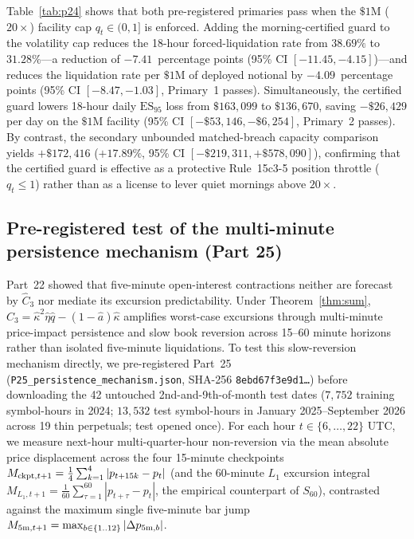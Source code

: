 Table~\ref{tab:p24} shows that both pre-registered primaries pass when the $\$1\text{M}$ ($20\times$) facility cap $q_t\in(0,1]$ is enforced. Adding the morning-certified guard to the volatility cap reduces the 18-hour forced-liquidation rate from $38.69\%$ to $31.28\%$---a reduction of $-7.41$~percentage points (95\% CI $[-11.45,-4.15]$)---and reduces the liquidation rate per $\$1\text{M}$ of deployed notional by $-4.09$~percentage points (95\% CI $[-8.47,-1.03]$, Primary~1 passes). Simultaneously, the certified guard lowers 18-hour daily $\mathrm{ES}_{95}$ loss from $\$163{,}099$ to $\$136{,}670$, saving $-\$26{,}429$ per day on the $\$1\text{M}$ facility (95\% CI $[-\$53{,}146,-\$6{,}254]$, Primary~2 passes). By contrast, the secondary unbounded matched-breach capacity comparison yields $+\$172{,}416$ ($+17.89\%$, 95\% CI $[-\$219{,}311,+\$578{,}090]$), confirming that the certified guard is effective as a protective Rule~15c3-5 position throttle ($q_t\le 1$) rather than as a license to lever quiet mornings above $20\times$.

\subsection{Pre-registered test of the multi-minute persistence mechanism (Part 25)}\label{sec:p25}
Part~22 showed that five-minute open-interest contractions neither are forecast by $\hat C_3$ nor mediate its excursion predictability. Under Theorem~\ref{thm:sum}, $\hat C_3=\hat\kappa^2\hat\eta\hat q-(1-\hat a)\hat\kappa$ amplifies worst-case excursions through multi-minute price-impact persistence and slow book reversion across 15--60 minute horizons rather than isolated five-minute liquidations. To test this slow-reversion mechanism directly, we pre-registered Part~25 (\texttt{P25\_persistence\_mechanism.json}, SHA-256 \texttt{8ebd67f3e9d1\ldots}) before downloading the 42 untouched 2nd-and-9th-of-month test dates ($7{,}752$ training symbol-hours in 2024; $13{,}532$ test symbol-hours in January 2025--September 2026 across 19 thin perpetuals; test opened once). For each hour $t\in\{6,\dots,22\}$ UTC, we measure next-hour multi-quarter-hour non-reversion via the mean absolute price displacement across the four 15-minute checkpoints $M_{{\rm ckpt},t+1}=\frac{1}{4}\sum_{k=1}^4|p_{t+15k}-p_t|$ (and the 60-minute $L_1$ excursion integral $M_{L_1,t+1}=\frac{1}{60}\sum_{\tau=1}^{60}|p_{t+\tau}-p_t|$, the empirical counterpart of $S_{60}$), contrasted against the maximum single five-minute bar jump $M_{5{\rm m},t+1}=\max_{b\in\{1..12\}}|\Delta p_{5{\rm m},b}|$.

